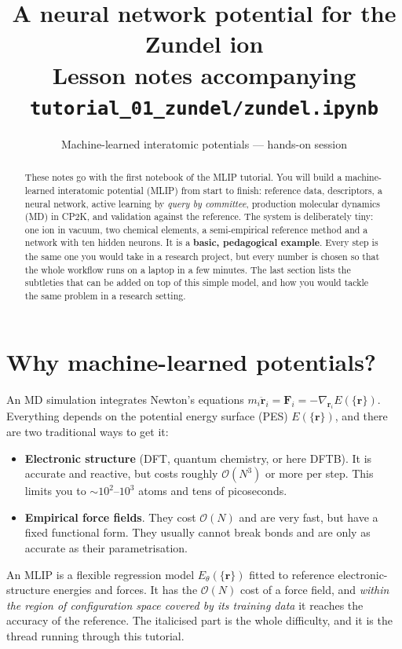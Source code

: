 \documentclass[11pt,a4paper]{article}
\title{\textbf{A neural network potential for the Zundel ion}\\[4pt]
\large Lesson notes accompanying \texttt{tutorial\_01\_zundel/zundel.ipynb}}
\author{Machine-learned interatomic potentials --- hands-on session}
\date{}
\begin{document}
\maketitle

\begin{abstract}
These notes go with the first notebook of the MLIP tutorial. You will build a
machine-learned interatomic potential (MLIP) from start to finish: reference
data, descriptors, a neural network, active learning by \emph{query by
committee}, production molecular dynamics (MD) in CP2K, and validation against
the reference. The system is deliberately tiny: one  ion in vacuum,
two chemical elements, a semi-empirical reference method and a network with
ten hidden neurons. It is a \textbf{basic, pedagogical example}. Every step is
the same one you would take in a research project, but every number is chosen
so that the whole workflow runs on a laptop in a few minutes. The last section
lists the subtleties that can be added on top of this simple model, and how
you would tackle the same problem in a research setting.
\end{abstract}

\tableofcontents

\section{Why machine-learned potentials?}

An MD simulation integrates Newton's equations
$m_i\ddot{\mathbf r}_i = \mathbf F_i = -\nabla_{\mathbf r_i}E(\{\mathbf r\})$.
Everything depends on the potential energy surface (PES) $E(\{\mathbf r\})$,
and there are two traditional ways to get it:
\begin{itemize}[nosep]
  \item \textbf{Electronic structure} (DFT, quantum chemistry, or here
        DFTB). It is accurate and reactive, but costs roughly $\mathcal O(N^3)$
        or more per step. This limits you to $\sim 10^2$--$10^3$ atoms and
        tens of picoseconds.
  \item \textbf{Empirical force fields}. They cost $\mathcal O(N)$ and are
        very fast, but have a fixed functional form. They usually cannot break
        bonds and are only as accurate as their parametrisation.
\end{itemize}
An MLIP is a flexible regression model $E_\theta(\{\mathbf r\})$ fitted to
reference electronic-structure energies and forces. It has the
$\mathcal O(N)$ cost of a force field, and \emph{within the region of
configuration space covered by its training data} it reaches the accuracy of
the reference. The italicised part is the whole difficulty, and it is the
thread running through this tutorial.
\end{document}
